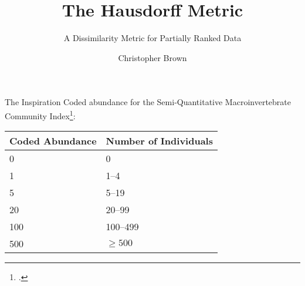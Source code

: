 \documentclass[pdf,usenames,dvipsnames,tikz]{beamer}%
\title{The Hausdorff Metric}
\subtitle{A Dissimilarity Metric for Partially Ranked Data}
\author{Christopher Brown}
\date{}
\begin{document}
\begin{frame}
	\titlepage
\end{frame}

\begin{frame}{The Inspiration}
	Coded abundance for the Semi-Quantitative Macroinvertebrate Community Index\footcite{sqmci}:
	
	\medskip
	
	\begin{tabular}{ll}
		\toprule
		Coded Abundance & Number of Individuals\\
		\midrule
		0 & 0\\
		1 & 1--4\\
		5 & 5--19\\
		20 & 20--99\\
		100 & 100--499\\
		500 & $\geq500$\\
		\bottomrule
	\end{tabular}
\end{frame}

\begin{frame}
	\printbibliography
\end{frame}
\end{document}
